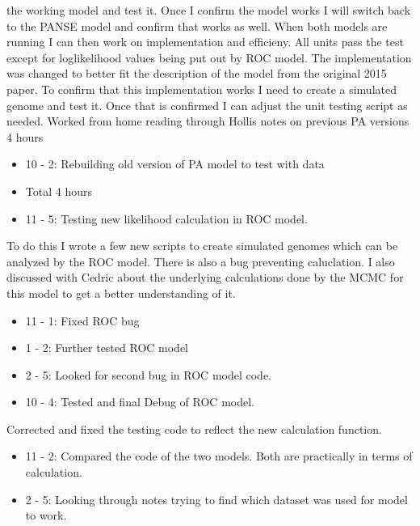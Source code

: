 \documentclass[12pt,hyperref]{labbook}
\begin{document}
the working model and test it. Once I confirm the model works I will switch back to the PANSE model and confirm that works as well.
When both models are running I can then work on implementation and efficieny.
All units pass the test except for loglikelihood values being put out by ROC model. The implementation was changed to better fit the
description of the model from the original 2015 paper. To confirm that this implementation works I need to create a simulated genome
and test it. Once that is confirmed I can adjust the unit testing script as needed.
Worked from home reading through Hollis notes on previous PA versions 4 hours
\begin{itemize}
 \item 10 - 2: Rebuilding old version of PA model to test with data
 \item Total 4 hours
\end{itemize}
\begin{itemize}
 \item 11 - 5: Testing new likelihood calculation in ROC model.
\end{itemize}
To do this I wrote a few new scripts to create simulated 
genomes which can be analyzed by the ROC model. There is also a bug preventing caluclation.
I also discussed with Cedric about the underlying calculations done
by the MCMC for this model to get a better understanding of it.
\begin{itemize}
    \item 11 - 1: Fixed ROC bug
    \item 1 - 2: Further tested ROC model
    \item 2 - 5: Looked for second bug in ROC model code. 
\end{itemize}
\begin{itemize}
    \item 10 - 4: Tested and final Debug of ROC model.
\end{itemize}
Corrected and fixed the testing code to reflect the new calculation function.
\begin{itemize}
    \item 11 - 2: Compared the code of the two models. Both are practically in terms of calculation.
    \item 2 - 5: Looking through notes trying to find which dataset was used for model to work.
\end{itemize}
\end{document}
